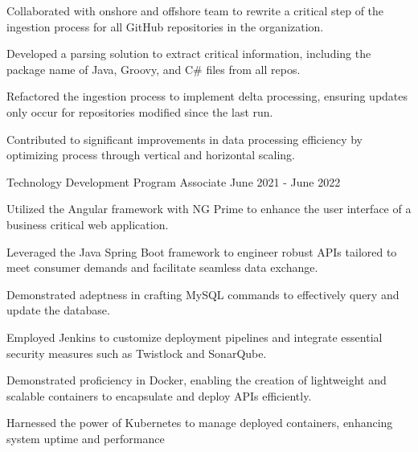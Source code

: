 \begin{cventries}
{\begin{cvitems}
        \item {Collaborated with onshore and offshore team to rewrite a critical step of the ingestion process for all GitHub repositories in the organization.}
        \item {Developed a parsing solution to extract critical information, including the package name of Java, Groovy, and C\# files from all repos.}
        \item {Refactored the ingestion process to implement delta processing, ensuring updates only occur for repositories modified since the last run.}
        \item {Contributed to significant improvements in data processing efficiency by optimizing process through vertical and horizontal scaling.}
      \end{cvitems}
    }
  \cventry
    {Technology Development Program Associate} %
    {} %
    {} %
    {June 2021 - June 2022} %
    {
      \begin{cvitems} %
        \item {Utilized the Angular framework with NG Prime to enhance the user interface of a business critical web application.}
        \item {Leveraged the Java Spring Boot framework to engineer robust APIs tailored to meet consumer demands and facilitate seamless data exchange.}
        \item {Demonstrated adeptness in crafting MySQL commands to effectively query and update the database.}
        \item {Employed Jenkins to customize deployment pipelines and integrate essential security measures such as Twistlock and SonarQube.}
        \item {Demonstrated proficiency in Docker, enabling the creation of lightweight and scalable containers to encapsulate and deploy APIs efficiently.}
        \item {Harnessed the power of Kubernetes to manage deployed containers, enhancing system uptime and performance}
      \end{cvitems}
    }

\end{cventries}
